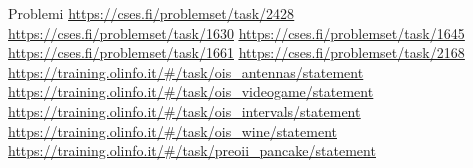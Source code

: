 \documentclass[compress]{beamer}
\begin{document}
\begin{frame}{}
\end{frame}

\begin{frame}{Problemi}
    \underline{\url{https://cses.fi/problemset/task/2428}}
    \underline{\url{https://cses.fi/problemset/task/1630}}
    \underline{\url{https://cses.fi/problemset/task/1645}}
    \underline{\url{https://cses.fi/problemset/task/1661}}
    \underline{\url{https://cses.fi/problemset/task/2168}}
    \underline{\url{https://training.olinfo.it/\#/task/ois_antennas/statement}}
    \underline{\url{https://training.olinfo.it/\#/task/ois_videogame/statement}}
    \underline{\url{https://training.olinfo.it/\#/task/ois_intervals/statement}}
    \underline{\url{https://training.olinfo.it/\#/task/ois_wine/statement}}
    \underline{\url{https://training.olinfo.it/\#/task/preoii_pancake/statement}}
\end{frame}
\end{document}
